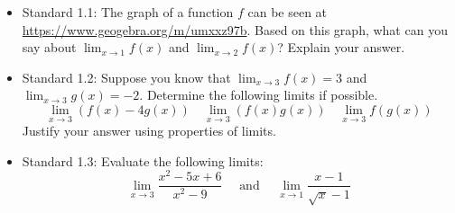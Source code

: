 \documentclass[11pt]{beamer}
\newcommand{\di}{\displaystyle}
\begin{document}


\begin{frame}
\begin{itemize}
\item Standard 1.1: The graph of a function $f$ can be seen at \href{https://www.geogebra.org/m/umxxz97b}{https://www.geogebra.org/m/umxxz97b}. Based on this graph, what can you say about $\di \lim_{x\to 1}f(x)$  and $\di\lim_{x\to 2}f(x)$?
Explain your answer.

\item Standard 1.2: Suppose you know that $\di \lim_{x\to 3}f(x)=3$ and $\di \lim_{x\to 3}g(x)=-2$. Determine the following limits if possible. 
\[
\lim_{x\to 3}(f(x)-4g(x))\quad \lim_{x\to 3}(f(x)g(x)) \quad \lim_{x\to 3}f(g(x))
\]
Justify your answer using properties of limits.
\item Standard 1.3: Evaluate the following limits:
\[
\lim_{x\to 3}\frac{x^2-5x+6}{x^2-9} \quad \text{ and } \quad \lim_{x\to 1}\frac{x-1}{\sqrt{x}-1}
\]
\end{itemize}
\end{frame}
\end{document}
